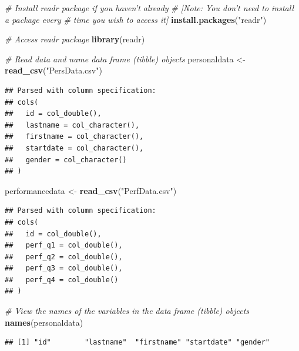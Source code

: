 \documentclass[]{book}
\newenvironment{Shaded}{\begin{snugshade}}{\end{snugshade}}
\newcommand{\KeywordTok}[1]{\textcolor[rgb]{0.13,0.29,0.53}{\textbf{#1}}}
\newcommand{\StringTok}[1]{\textcolor[rgb]{0.31,0.60,0.02}{#1}}
\newcommand{\CommentTok}[1]{\textcolor[rgb]{0.56,0.35,0.01}{\textit{#1}}}
\newcommand{\NormalTok}[1]{#1}
\begin{document}
\begin{Shaded}
\begin{Highlighting}[]
\CommentTok{# Install readr package if you haven't already}
\CommentTok{# [Note: You don't need to install a package every }
\CommentTok{# time you wish to access it]}
\KeywordTok{install.packages}\NormalTok{(}\StringTok{"readr"}\NormalTok{)}
\end{Highlighting}
\end{Shaded}

\begin{Shaded}
\begin{Highlighting}[]
\CommentTok{# Access readr package}
\KeywordTok{library}\NormalTok{(readr)}

\CommentTok{# Read data and name data frame (tibble) objects}
\NormalTok{personaldata <-}\StringTok{ }\KeywordTok{read_csv}\NormalTok{(}\StringTok{"PersData.csv"}\NormalTok{)}
\end{Highlighting}
\end{Shaded}

\begin{verbatim}
## Parsed with column specification:
## cols(
##   id = col_double(),
##   lastname = col_character(),
##   firstname = col_character(),
##   startdate = col_character(),
##   gender = col_character()
## )
\end{verbatim}

\begin{Shaded}
\begin{Highlighting}[]
\NormalTok{performancedata <-}\StringTok{ }\KeywordTok{read_csv}\NormalTok{(}\StringTok{"PerfData.csv"}\NormalTok{)}
\end{Highlighting}
\end{Shaded}

\begin{verbatim}
## Parsed with column specification:
## cols(
##   id = col_double(),
##   perf_q1 = col_double(),
##   perf_q2 = col_double(),
##   perf_q3 = col_double(),
##   perf_q4 = col_double()
## )
\end{verbatim}

\begin{Shaded}
\begin{Highlighting}[]
\CommentTok{# View the names of the variables in the data frame (tibble) objects}
\KeywordTok{names}\NormalTok{(personaldata)}
\end{Highlighting}
\end{Shaded}

\begin{verbatim}
## [1] "id"        "lastname"  "firstname" "startdate" "gender"
\end{verbatim}
\end{document}
